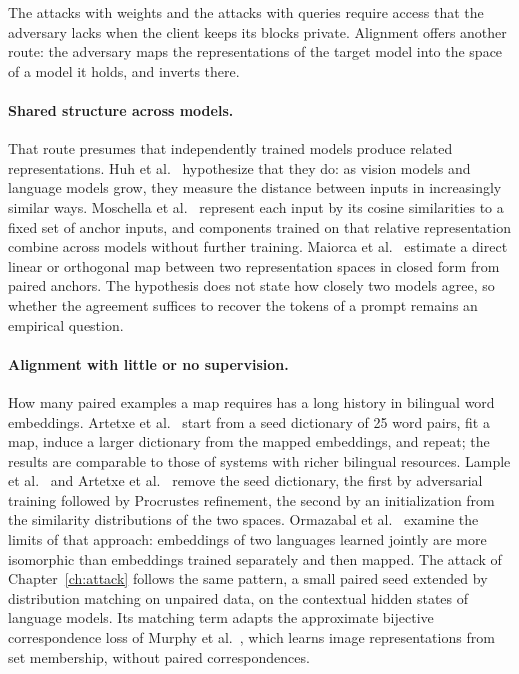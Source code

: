 The attacks with weights and the attacks with queries require access that the adversary lacks when the client keeps its blocks private.
Alignment offers another route: the adversary maps the representations of the target model into the space of a model it holds, and inverts there.

\paragraph{Shared structure across models.} That route presumes that independently trained models produce related representations.
Huh et al.~\cite{huh2024platonic} hypothesize that they do: as vision models and language models grow, they measure the distance between inputs in increasingly similar ways.
Moschella et al.~\cite{moschella2023relative} represent each input by its cosine similarities to a fixed set of anchor inputs, and components trained on that relative representation combine across models without further training.
Maiorca et al.~\cite{maiorca2023latent} estimate a direct linear or orthogonal map between two representation spaces in closed form from paired anchors.
The hypothesis does not state how closely two models agree, so whether the agreement suffices to recover the tokens of a prompt remains an empirical question.

\paragraph{Alignment with little or no supervision.} How many paired examples a map requires has a long history in bilingual word embeddings.
Artetxe et al.~\cite{artetxe2017learning} start from a seed dictionary of 25 word pairs, fit a map, induce a larger dictionary from the mapped embeddings, and repeat; the results are comparable to those of systems with richer bilingual resources.
Lample et al.~\cite{conneau2018word} and Artetxe et al.~\cite{artetxe2018robust} remove the seed dictionary, the first by adversarial training followed by Procrustes refinement, the second by an initialization from the similarity distributions of the two spaces.
Ormazabal et al.~\cite{ormazabal2019analyzing} examine the limits of that approach: embeddings of two languages learned jointly are more isomorphic than embeddings trained separately and then mapped.
The attack of Chapter~\ref{ch:attack} follows the same pattern, a small paired seed extended by distribution matching on unpaired data, on the contextual hidden states of language models.
Its matching term adapts the approximate bijective correspondence loss of Murphy et al.~\cite{murphy2022abc}, which learns image representations from set membership, without paired correspondences.

